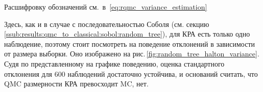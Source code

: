 \begin{table}


    \footnotesize{Расшифровку обозначений см.~в~\ref{eq:rqmc_variance_estimation}}
\end{table}

Здесь, как и в случае с последовательностью Соболя (см. секцию\,\ref{ssub:results:qmc_to_classical:sobol:random_tree}), для КРА есть только одно наблюдение, поэтому стоит посмотреть на поведение отклонений в зависимости от размера выборки. Оно изображено на рис.\,\ref{fig:random_tree_halton_variance}. Судя по представленному на графике поведению, оценка стандартного отклонения для 600 наблюдений достаточно устойчива, и оснований считать, что QMC размерности КРА превосходит MC, нет.

